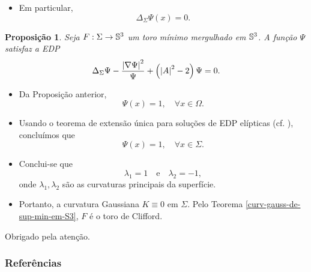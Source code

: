 \documentclass[12pt,a4paper]{beamer}
\newtheorem{proposicao}{Proposição}
\theoremstyle{definition}
\begin{document}
\begin{frame}	

	\begin{itemize}
		\item Em particular,
		\begin{equation*}
		\Delta_{\Sigma} \Psi(x) = 0.
		\end{equation*}
	\end{itemize}	
	
	\pause

	\begin{proposicao}
		Seja $F: \Sigma \rightarrow \mathbb{S}^3$ um toro mínimo mergulhado em $\mathbb{S}^3$. A função $\Psi$ satisfaz a EDP
		\begin{equation*}
			\Delta_{\Sigma} \Psi - \frac{\left| \nabla \Psi \right|^2}{\Psi} + \left( \left| A \right|^2 - 2 \right) \Psi = 0.
		\end{equation*}
	\end{proposicao}

	\pause
	
	\begin{itemize}
		\item Da Proposição anterior,
		\[ \Psi(x) = 1, \quad \forall x \in \Omega. \]
	\end{itemize}

\end{frame}
	
\begin{frame}	
	
	\begin{itemize}
		\item Usando o teorema de extensão única para soluções de EDP elípticas (cf. \cite{Aronszajn1957}), concluímos que
		\[ \Psi(x) = 1, \quad \forall x \in \Sigma. \]
		
		\pause
		
		\item Conclui-se que
		\[ \lambda_1 = 1 \quad \text{e} \quad \lambda_2 = -1, \]
		onde $\lambda_1,\lambda_2$ são as curvaturas principais da superfície.
		
		\pause
		
		\item 	Portanto, a curvatura Gaussiana $K \equiv 0$ em $\Sigma$. Pelo Teorema \ref{curv-gauss-de-sup-min-em-S3}, $F$ é o toro de Clifford.
	\end{itemize}
	
	
	
	


\end{frame}

\begin{frame}
	\begin{center}
		\huge Obrigado pela atenção.
	\end{center}
\end{frame}

\begin{frame}[allowframebreaks]
	\frametitle{Referências}
	
\end{frame}
\end{document}
